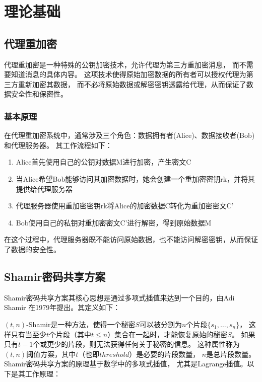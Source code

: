 \chapter{理论基础}

\section{代理重加密}

代理重加密是一种特殊的公钥加密技术，允许代理为第三方重加密消息，
而不需要知道消息的具体内容。
这项技术使得原始加密数据的所有者可以授权代理为第三方重新加密其数据，
而不必将原始数据或解密密钥透露给代理，从而保证了数据安全性和保密性。

\subsection{基本原理}

在代理重加密系统中，通常涉及三个角色：数据拥有者(Alice)、数据接收者(Bob)和代理服务器。
其工作流程如下：

\begin{enumerate}
	\item Alice首先使用自己的公钥对数据M进行加密，产生密文C
	\item 当Alice希望Bob能够访问其加密数据时，她会创建一个重加密密钥rk，并将其提供给代理服务器
	\item 代理服务器使用重加密密钥rk将Alice的加密数据C转化为重加密密文C'
	\item Bob使用自己的私钥对重加密密文C'进行解密，得到原始数据M
\end{enumerate}

在这个过程中，代理服务器既不能访问原始数据，也不能访问解密密钥，从而保证了数据的安全性。

\section{Shamir密码共享方案}

Shamir密码共享方案其核心思想是通过多项式插值来达到一个目的，由Adi Shamir
在1979年提出。其定义如下：

$(t,n)$-Shamir是一种方法，使得一个秘密$S$可以被分割为$n$个片段$\{s_1,\ldots,s_n\}$，
这样只有当至少$t$个片段（其中$t \leq n$）集合在一起时，才能恢复原始的秘密$S$。
如果只有$t-1$个或更少的片段，则无法获得任何关于秘密的信息。
这种属性称为$(t,n)$阈值方案，其中$t$（也即$threshold$）是必要的片段数量，
$n$是总片段数量。Shamir密码共享方案的原理基于数学中的多项式插值，
尤其是Lagrange插值。以下是其工作原理：

